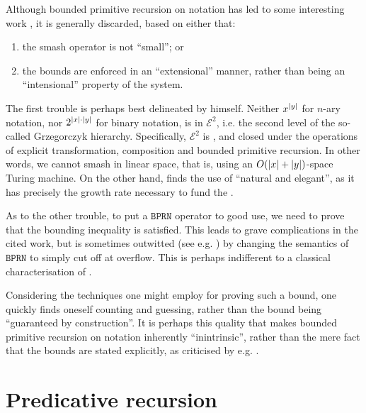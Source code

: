 Although bounded primitive recursion on notation has led to some interesting
work \cite{cook-1975, buss-phd-1985-6, cook-urquhart-1993}, it is generally
discarded\cite{bellantoni-cook-1992}, based on either that:

\begin{enumerate}[label=(\arabic*)]

\item the smash operator is not ``small''; or

\item the bounds are enforced in an ``extensional'' manner, rather than being
an ``intensional'' property of the system.

\end{enumerate}

The first trouble is perhaps best delineated by \cite{cobham-1965} himself.
Neither $x^{\mathopen{}\left|{y}\right|\mathclose{}}$ for $n$-ary notation, nor $2^{{\mathopen{}\left|{x}\right|\mathclose{}} \cdot {\ensuremath{\mathopen{}\left|{y}\right|\mathclose{}}}}$
for binary notation, is in $\mathcal{E}^2$, i.e. the second level of the
so-called Grzegorczyk hierarchy\cite{grzegorczyk-1953}. Specifically,
$\mathcal{E}^2$ is , and closed under the operations of explicit
transformation, composition and bounded primitive recursion. In other words, we
cannot smash in linear space, that is, using an $O{\mathopen{}\left({{\mathopen{}\left|{x}\right|\mathclose{}}+{\mathopen{}\left|{y}\right|\mathclose{}}}\right)\mathclose{}}$-space
Turing machine\cite{ritchie-1963}. On the other hand, \cite{buss-phd-1985-6}
finds the use of \smashf{} ``natural and elegant'', as it has precisely the
growth rate necessary to fund the .

As to the other trouble, to put a $\mathtt{BPRN}$ operator to good use, we need
to prove that the bounding inequality is satisfied.  This leads to grave
complications in the cited work, but is sometimes outwitted (see e.g.
\cite{cook-urquhart-1993}) by changing the semantics of $\mathtt{BPRN}$ to
simply cut off at overflow. This is perhaps indifferent to a classical
characterisation of \FPTIME{}.

Considering the techniques one might employ for proving such a bound, one
quickly finds oneself counting and guessing, rather than the bound being
``guaranteed by construction''.  It is perhaps this quality that makes bounded
primitive recursion on notation inherently ``inintrinsic'', rather than the
mere fact that the bounds are stated explicitly, as criticised by e.g.
\cite{hofmann-2000a}.

\section{Predicative recursion}

